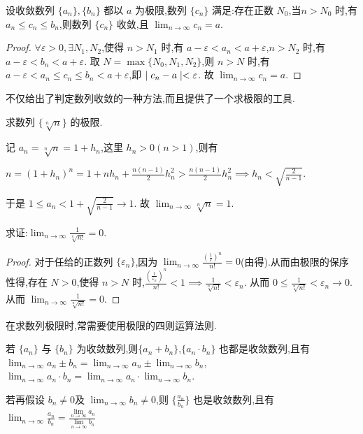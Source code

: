 \begin{theorem}[数列的迫敛性]\label{thm:polian}
    设收敛数列 $\{a_n\},\{b_n\}$ 都以 $a$ 为极限,数列 $\{c_n\}$ 满足:存在正数 $N_0$,当$n>N_0$ 时,有 $a_n\le c_n \le b_n$,则数列 $\{c_n\}$ 收敛,且 $\lim_{n\to\infty} c_n=a$.
\end{theorem}

\begin{proof}
    $\forall \varepsilon>0,\exists N_1,N_2 $,使得 $ n>N_1$ 时,有 $a-\varepsilon<a_n<a+\varepsilon$,$ n>N_2$ 时,有 $a-\varepsilon<b_n<a+\varepsilon$.
    取 $N=\max\{N_0,N_1,N_2\}$,则 $n>N$ 时,有 $a-\varepsilon<a_n\le c_n\le b_n<a+\varepsilon$,即 $\mid c_n-a \mid<\varepsilon$. 故 $\lim_{n\to\infty} c_n=a$.
\end{proof}

不仅给出了判定数列收敛的一种方法,而且提供了一个求极限的工具.

\begin{example}
    求数列 $\{\sqrt[n]{n}\}$ 的极限.
\end{example}

\begin{solve}
    记 $a_n=\sqrt[n]{n}=1+h_n$,这里 $h_n>0(n>1)$,则有 
    
    $n=(1+h_n)^n=1+nh_n+\frac{n(n-1)}{2}h_n^2>\frac{n(n-1)}{2}h_n^2\implies h_n<\sqrt{\frac{2}{n-1}}$.

    于是 $1\le a_n<1+\sqrt{\frac{2}{n-1}}\to 1$. 故 $\lim_{n\to\infty} \sqrt[n]{n}=1$.
\end{solve}

\begin{example}
    求证:$\lim_{n\to\infty} \frac{1}{\sqrt[n]{n!}}=0$.
\end{example}

\begin{proof}
    对于任给的正数列 $\{\varepsilon_n\}$,因为 $\lim_{n\to\infty} \frac{(\frac{1}{\varepsilon})^n}{n!}=0$(由得).从而由极限的保序性得,存在 $N>0$,使得 $n>N$ 时,$\frac{(\frac{1}{\varepsilon_n})^n}{n!}<1\implies \frac{1}{\sqrt[n]{n!}}<\varepsilon_n$. 从而 $0\le \frac{1}{\sqrt[n]{n!}}<\varepsilon_n\to 0$. 从而 $\lim_{n\to\infty} \frac{1}{\sqrt[n]{n!}}=0$.
\end{proof}

在求数列极限时,常需要使用极限的四则运算法则.

\begin{theorem}[极限的四则运算法则]
    若 $\{a_n\}$ 与 $\{b_n\}$ 为收敛数列,则$\{a_n+b_n\}$,$\{a_n\cdot b_n\}$ 也都是收敛数列,且有 $\lim_{n\to\infty} a_n\pm b_n=\lim_{n\to\infty} a_n\pm \lim_{n\to\infty} b_n$,$\lim_{n\to\infty} a_n\cdot b_n=\lim_{n\to\infty} a_n\cdot\lim_{n\to\infty} b_n$.

    若再假设 $b_n\ne 0$及 $\lim_{n\to\infty} b_n\ne 0$,则 $\{\frac{a_n}{b_n}\}$ 也是收敛数列,且有 $\lim_{n\to\infty} \frac{a_n}{b_n}=\frac{\lim\limits_{n\to\infty} a_n}{\lim\limits_{n\to\infty} b_n}$
\end{theorem}

